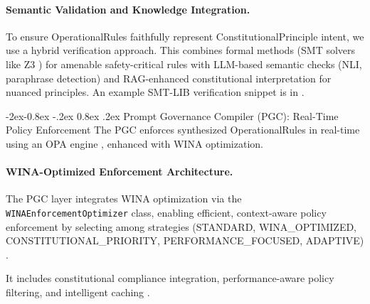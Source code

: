 \documentclass[manuscript,screen,review,anonymous,9pt]{acmart}
\makeatletter
\renewcommand\subsubsection{\@startsection{subsubsection}{3}{\z@}%
  {-2ex\@plus -0.8ex \@minus -.2ex}%
  {0.8ex \@plus .2ex}%
  {\normalfont\normalsize\bfseries}}
\makeatother
\begin{document}
\paragraph{Semantic Validation and Knowledge Integration.}
\label{subsubsec:semantic_validation}
To ensure OperationalRules faithfully represent ConstitutionalPrinciple intent, we use a hybrid verification approach. This combines formal methods (SMT solvers like Z3 \cite{Barrett2018SMTSolving, DeMouraZ3}) for amenable safety-critical rules with LLM-based semantic checks (NLI, paraphrase detection) and RAG-enhanced constitutional interpretation for nuanced principles. An example SMT-LIB verification snippet is in .

\subsubsection{Prompt Governance Compiler (PGC): Real-Time Policy Enforcement}
\label{subsubsec:pgc_layer}
The PGC enforces synthesized OperationalRules in real-time using an OPA engine \cite{Sandall2021OPAReference}, enhanced with WINA optimization.

\paragraph{WINA-Optimized Enforcement Architecture.} \sloppy The PGC layer integrates WINA optimization via the \texttt{WINAEnforcementOptimizer} class, enabling efficient, context-aware policy enforcement by selecting among strategies (STANDARD, WINA\_OPTIMIZED, CONSTITUTIONAL\_PRIORITY, PERFORMANCE\_FOCUSED, ADAPTIVE) \cite{PolicyEnforcementOptimization2024}.

It includes constitutional compliance integration, performance-aware policy filtering, and intelligent caching \cite{ConstitutionalCompliance2024, IntelligentCaching2024}. \fussy
\end{document}
